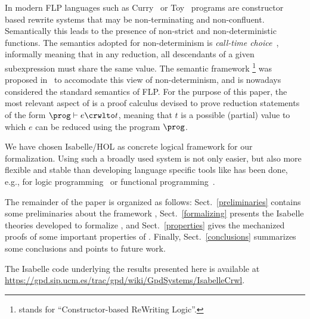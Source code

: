 \documentclass{llncs}
\begin{document}
In modern FLP languages such as Curry~\cite{Han06curry} or
Toy~\cite{LS99} programs are constructor based rewrite systems that
may be non-terminating and non-confluent. Semantically this leads to
the presence of non-strict and non-deterministic functions. The
semantics adopted for non-determinism is \emph{call-time
  choice}~\cite{hussmann93,GHLR99}, informally meaning that in any
reduction, all descendants of a given subexpression must share the
same value. The semantic framework \crwl \footnote{\crwl{} stands for ``Constructor-based ReWriting Logic''.}
was proposed in~\cite{GHLR96,GHLR99} to accomodate this view of
non-determinism, and is nowadays considered the standard semantics of
FLP. For the purpose of this paper, the most relevant aspect of
\crwl{} is a proof calculus devised to prove reduction statements of
the form $\prog \vdash e \crwlto t$, meaning that $t$ is a possible
(partial) value to which $e$ can be reduced using the program $\prog$.




We have chosen Isabelle/HOL as concrete logical framework for our
formalization. Using such a broadly used system is not only easier,
but also more flexible and stable than developing language specific
tools like has been done, e.g., for logic programming~\cite{Stark98}
or functional programming~\cite{MolEP01}.

The remainder of the paper is organized as follows:
Sect.~\ref{preliminaries} contains some preliminaries about the
\crwl{} framework ,
Sect.~\ref{formalizing} presents the Isabelle theories developed to
formalize \crwl{}, and Sect.~\ref{properties} gives the mechanized
proofs of some important properties of \crwl{}. Finally,
Sect.~\ref{conclusions} summarizes some conclusions and points to
future work.

The Isabelle code underlying the results presented here is available
at \url{https://gpd.sip.ucm.es/trac/gpd/wiki/GpdSystems/IsabelleCrwl}.
\end{document}
